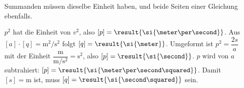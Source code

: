 Summanden müssen dieselbe Einheit haben, und beide Seiten einer Gleichung ebenfalls.
\begin{abcliste}
\abc $p^2$ hat die Einheit von $v^2$, also $[p] = \result{\si{\meter\per\second}}$. Aus $[a]\cdot[q] = \si{\meter\squared\per\second\squared}$ folgt $[q] = \result{\si{\meter}}$.
\abc Umgeformt ist $p^2 = \dfrac{2s}{a}$ mit der Einheit $\dfrac{\si{\meter}}{\si{\meter\per\second\squared}} = \si{\second\squared}$, also $[p] = \result{\si{\second}}$.
\abc $p$ wird von $a$ subtrahiert: $[p] = \result{\si{\meter\per\second\squared}}$. Damit $[s] = \si{\meter}$ ist, muss $[q] = \result{\si{\second\squared}}$ sein.
\end{abcliste}
